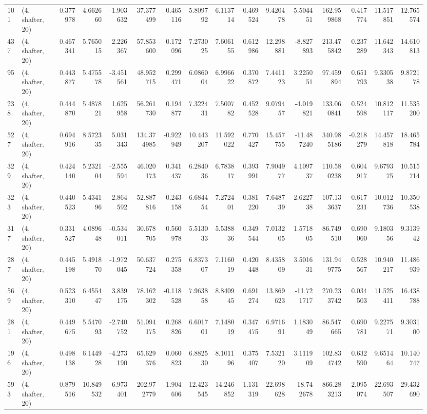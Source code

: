 \begin{tabular}{llrrrrrrrrrrrrrr}
101 &  (4, shafter, 20) &   0.377978 &   4.662660 &  -1.903632 &    37.377499 &   0.465116 &   5.809792 &   6.113714 &  0.469524 &   9.420478 &   5.504451 &   162.959868 &  0.417774 &  11.517851 &  12.765574 \\
437 &  (4, shafter, 20) &   0.467341 &   5.765015 &   2.226367 &    57.853600 &   0.172096 &   7.273025 &   7.606155 &  0.612986 &  12.298881 &  -8.827893 &   213.475842 &  0.237289 &  11.642343 &  14.610813 \\
95  &  (4, shafter, 20) &   0.443877 &   5.475578 &  -3.451561 &    48.952715 &   0.299471 &   6.086004 &   6.996622 &  0.370872 &   7.441123 &   3.225051 &    97.459894 &  0.651793 &   9.330538 &   9.872178 \\
238 &  (4, shafter, 20) &   0.444870 &   5.487821 &   1.625958 &    56.261730 &   0.194877 &   7.322431 &   7.500782 &  0.452528 &   9.079457 &  -4.019821 &   133.060841 &  0.524598 &  10.812117 &  11.535200 \\
527 &  (4, shafter, 20) &   0.694916 &   8.572335 &   5.031343 &   134.374985 &  -0.922949 &  10.443207 &  11.592022 &  0.770427 &  15.457755 & -11.487240 &   340.985186 & -0.218279 &  14.457818 &  18.465784 \\
329 &  (4, shafter, 20) &   0.424140 &   5.232104 &  -2.555594 &    46.020173 &   0.341437 &   6.284036 &   6.783817 &  0.393991 &   7.904977 &   4.109737 &   110.580238 &  0.604917 &   9.679375 &  10.515714 \\
323 &  (4, shafter, 20) &   0.440523 &   5.434196 &  -2.864592 &    52.887816 &   0.243158 &   6.684454 &   7.272401 &  0.381220 &   7.648739 &   2.622738 &   107.133637 &  0.617231 &  10.012736 &  10.350538 \\
317 &  (4, shafter, 20) &   0.331527 &   4.089648 &  -0.534011 &    30.678705 &   0.560978 &   5.513033 &   5.538836 &  0.349544 &   7.013205 &   1.571805 &    86.749510 &  0.690060 &   9.180356 &   9.313942 \\
287 &  (4, shafter, 20) &   0.445198 &   5.491870 &  -1.972045 &    50.637724 &   0.275358 &   6.837307 &   7.116019 &  0.420448 &   8.435809 &   3.501631 &   131.949775 &  0.528567 &  10.940217 &  11.486939 \\
569 &  (4, shafter, 20) &   0.523310 &   6.455447 &   3.839175 &    78.162302 &  -0.118528 &   7.963858 &   8.840945 &  0.691274 &  13.869623 & -11.721717 &   270.233742 &  0.034503 &  11.525411 &  16.438788 \\
281 &  (4, shafter, 20) &   0.449675 &   5.547093 &  -2.740752 &    51.094175 &   0.268826 &   6.601701 &   7.148019 &  0.347475 &   6.971691 &   1.183049 &    86.547665 &  0.690781 &   9.227571 &   9.303100 \\
196 &  (4, shafter, 20) &   0.498138 &   6.144928 &  -4.273190 &    65.629376 &   0.060823 &   6.882530 &   8.101196 &  0.375407 &   7.532120 &   3.111909 &   102.834742 &  0.632590 &   9.651464 &  10.140747 \\
593 &  (4, shafter, 20) &   0.879516 &  10.849532 &   6.973401 &   202.972779 &  -1.904606 &  12.423545 &  14.246852 &  1.131319 &  22.698628 & -18.742678 &   866.283213 & -2.095074 &  22.693507 &  29.432690 \\
\bottomrule
\end{tabular}
